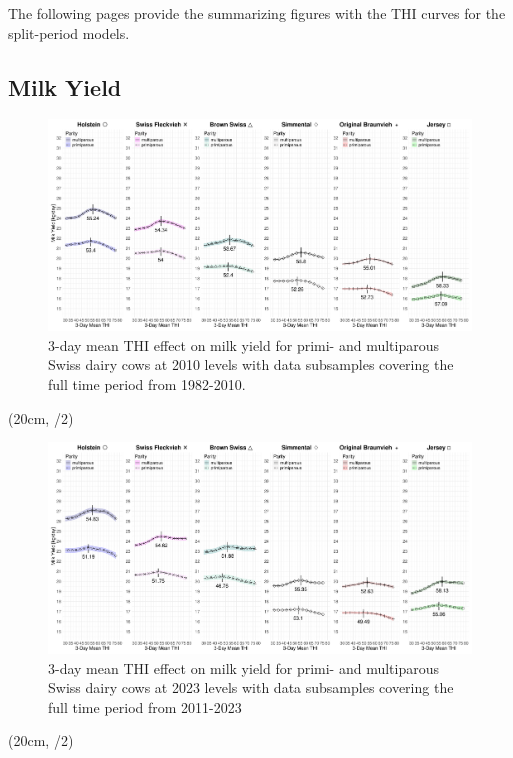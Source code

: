 
The following pages provide the summarizing figures with the THI curves for the split-period models.
\newpage
\begin{landscape}
    \thispagestyle{empty}
    \section{Milk Yield}
    \begin{figure}[ht]
        \centering
        \includegraphics[width=0.85\paperheight]{thesis/figures/results/milk_yield_before_2010.png}
        \caption[]{3-day mean THI effect on milk yield for primi- and multiparous Swiss dairy cows at 2010 levels with data subsamples covering the full time period from 1982-2010.}
        \label{fig:results_milk_yield_before_2010}
    \end{figure}
    
    \begin{textblock*}{2cm}(20cm, \dimexpr\paperheight/2)
    \end{textblock*}
\end{landscape}

\newpage
\begin{landscape}
    \thispagestyle{empty}
    \begin{figure}[ht]
        \centering
        \includegraphics[width=0.85\paperheight]{thesis/figures/results/milk_yield_after_2010.png}
        \caption[]{3-day mean THI effect on milk yield for primi- and multiparous Swiss dairy cows at 2023 levels with data subsamples covering the full time period from 2011-2023}
        \label{fig:results_milk_yield_after_2010}
    \end{figure}
    
    \begin{textblock*}{2cm}(20cm, \dimexpr\paperheight/2)
    \end{textblock*}
\end{landscape}


